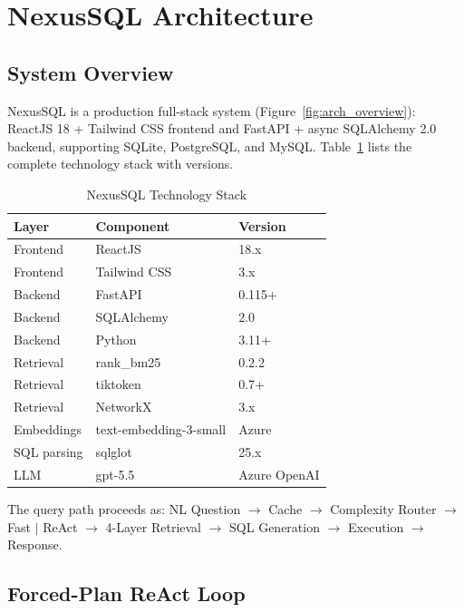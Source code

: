 \documentclass[conference]{IEEEtran}
\begin{document}
\section{NexusSQL Architecture}
\label{sec:nexussql}

\subsection{System Overview}

NexusSQL is a production full-stack system (Figure~\ref{fig:arch_overview}): ReactJS 18 + Tailwind CSS
frontend and FastAPI + async SQLAlchemy 2.0 backend, supporting
SQLite, PostgreSQL, and MySQL. Table~\ref{tab:techstack} lists the
complete technology stack with versions.

\begin{table}[!htb]
\caption{NexusSQL Technology Stack}
\label{tab:techstack}
\centering
\small
\begin{tabular}{lll}
\toprule
\textbf{Layer} & \textbf{Component} & \textbf{Version} \\
\midrule
Frontend    & ReactJS          & 18.x \\
Frontend    & Tailwind CSS     & 3.x \\
Backend     & FastAPI          & 0.115+ \\
Backend     & SQLAlchemy       & 2.0 \\
Backend     & Python           & 3.11+ \\
Retrieval   & rank\_bm25       & 0.2.2 \\
Retrieval   & tiktoken         & 0.7+ \\
Retrieval   & NetworkX         & 3.x \\
Embeddings  & text-embedding-3-small & Azure \\
SQL parsing & sqlglot          & 25.x \\
LLM         & gpt-5.5          & Azure OpenAI \\
\bottomrule
\end{tabular}
\end{table}

\noindent The query path proceeds as: NL Question $\to$ Cache $\to$ Complexity Router $\to$ {Fast $|$ ReAct} $\to$ 4-Layer Retrieval $\to$ SQL Generation $\to$ Execution $\to$ Response.

\subsection{Forced-Plan ReAct Loop}
\end{document}
